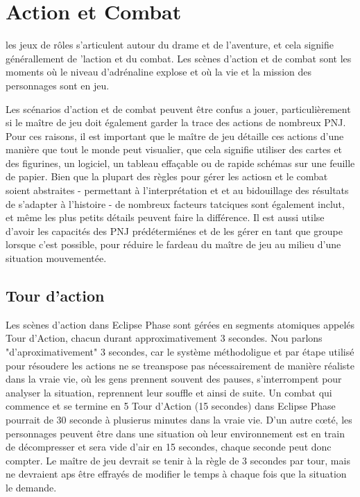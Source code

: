 



\chapter{Action et Combat} \label{chap:action-combat} 

les jeux de rôles s'articulent autour du drame et de l'aventure, et cela signifie générallement de 'laction et du combat. Les scènes d'action et de combat sont les moments où le niveau d'adrénaline explose et où la vie et la mission des personnages sont en jeu. 

Les scénarios d'action et de combat peuvent être confus a  jouer, particulièrement si le maître de jeu doit également garder la trace des actions de nombreux PNJ. Pour ces raisons, il est important que le maître de jeu détaille ces actions d'une manière que tout le monde peut visualier, que cela signifie utiliser des cartes et des figurines, un logiciel, un tableau effaçable ou de rapide schémas sur une feuille de papier. Bien que la plupart des règles pour gérer les actiosn et le combat soient abstraites - permettant à l'interprétation et et au bidouillage des résultats de s'adapter à l'histoire - de nombreux facteurs tatciques sont également inclut, et même les plus petits détails peuvent faire la différence. Il est aussi utilse d'avoir les capacités des PNJ prédétermiénes et de les gérer en tant que groupe lorsque c'est possible, pour réduire le fardeau du maître de jeu au milieu d'une situation mouvementée. 



\section{Tour d'action} \label{sec:combat-action-turns} 

Les scènes d'action dans Eclipse Phase sont gérées en segments atomiques appelés Tour d'Action, chacun durant approximativement 3 secondes. Nou parlons "d'aproximativement" 3 secondes, car le système méthodoligue et par étape utilisé pour résoudere les actions ne se treanspose pas nécessairement de manière réaliste dans la vraie vie, où les gens prennent souvent des pauses, s'interrompent pour analyser la situation, reprennent leur souffle et ainsi de suite. Un combat qui commence et se termine en 5 Tour d'Action (15 secondes) dans Eclipse Phase pourrait de 30 seconde à plusierus minutes dans la vraie vie. D'un autre cœté, les personnages peuvent être dans une situation où leur environnement est en train de décompresser et sera vide d'air en 15 secondes, chaque seconde peut donc compter. Le maître de jeu devrait se tenir à la règle de 3 secondes par tour, mais ne devraient aps être effrayés de modifier le temps à chaque fois que la situation le demande. 


